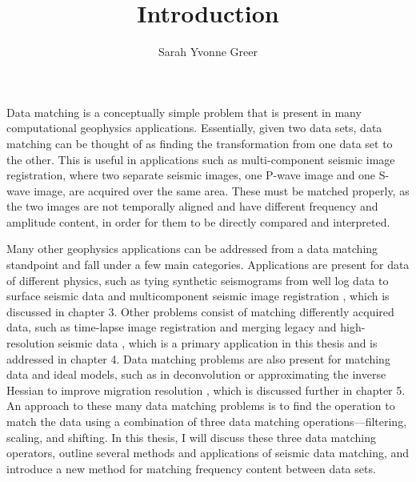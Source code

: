 \title{Introduction}
\author{Sarah Yvonne Greer}
\maketitle

Data matching is a conceptually simple problem that is present in many computational geophysics applications. 
Essentially, given two data sets, data matching can be thought of as finding the transformation from one data set to the other. 
This is useful in applications such as multi-component seismic image registration, where two separate seismic images, one P-wave image and one S- wave image, are acquired over the same area. 
These must be matched properly, as the two images are not temporally aligned and have different frequency and amplitude content, in order for them to be directly compared and interpreted. 

Many other geophysics applications can be addressed from a data matching standpoint and fall under a few main categories.
Applications are present for data of different physics, such as tying synthetic seismograms from well log data to surface seismic data \cite[]{herrera, bader} and multicomponent seismic image registration \cite[]{multi,warp,hardage}, which is discussed in chapter 3.
Other problems consist of matching differently acquired data, such as time-lapse image registration \cite[]{timelapse} and merging legacy and high-resolution seismic data \cite[]{merge}, which is a primary application in this thesis and is addressed in chapter 4.
Data matching problems are also present for matching data and ideal models, such as in deconvolution or approximating the inverse Hessian to improve migration resolution \cite[]{migdec,rtmmf,mighess}, which is discussed further in chapter 5.
An approach to these many data matching problems is to find the operation to match the data using a combination of three data matching operations---filtering, scaling, and shifting.
In this thesis, I will discuss these three data matching operators, outline several methods and applications of seismic data matching, and introduce a new method for matching frequency content between data sets.

